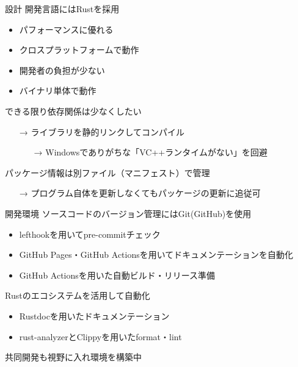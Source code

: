 \documentclass[
    t,
    allowframebreaks,
    aspectratio=32,
    unicode
]{beamer}
\newcommand{\lf}{\vspace{\baselineskip}}
\begin{document}
    \begin{frame}{\secname}{設計}
        開発言語にはRustを採用
        \begin{itemize}
            \item パフォーマンスに優れる
            \item クロスプラットフォームで動作
            \item 開発者の負担が少ない
            \item バイナリ単体で動作
        \end{itemize}\pause

        \lf
        できる限り依存関係は少なくしたい
        \begin{itemize}
            \item[→] ライブラリを静的リンクしてコンパイル
                \begin{itemize}
                    \item[→] Windowsでありがちな「VC++ランタイムがない」を回避
                \end{itemize}
        \end{itemize}\pause

        \lf
        パッケージ情報は別ファイル（マニフェスト）で管理
        \begin{itemize}
            \item[→] プログラム自体を更新しなくてもパッケージの更新に追従可
        \end{itemize}
    \end{frame}
    \begin{frame}{\secname}{開発環境}
        ソースコードのバージョン管理にはGit(GitHub)を使用
        \begin{itemize}
            \item lefthookを用いてpre-commitチェック
            \item GitHub Pages・GitHub Actionsを用いてドキュメンテーションを自動化
            \item GitHub Actionsを用いた自動ビルド・リリース準備
        \end{itemize}\pause

        \lf
        Rustのエコシステムを活用して自動化
        \begin{itemize}
            \item Rustdocを用いたドキュメンテーション
            \item rust-analyzerとClippyを用いたformat・lint
        \end{itemize}\pause

        \lf
        共同開発も視野に入れ環境を構築中
    \end{frame}
\end{document}
